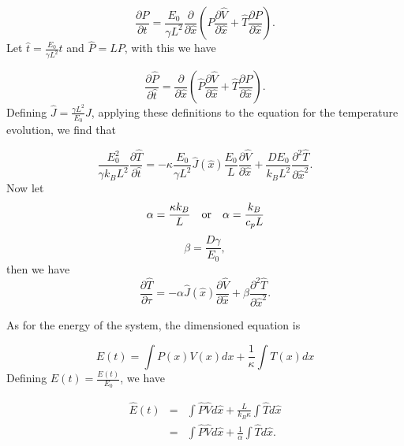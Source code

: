 \begin{equation}
\frac{\partial P}{\partial t} = \frac{E_0}{\gamma L^2} \frac{\partial}{\partial \hat{x}} \left (P \frac{\partial \hat{V}}{\partial \hat{x}} + \hat{T} \frac{\partial P}{\partial \hat{x}} \right ).
\end{equation}
Let $\hat{t} = \frac{E_0}{\gamma L^2} t$ and $\hat{P} = L P $, with this we have

\begin{equation}
\frac{\partial \hat{P}}{\partial \hat{t}} = \frac{\partial}{\partial \hat{x}} \left (\hat{P} \frac{\partial \hat{V}}{\partial \hat{x}} + \hat{T}  \frac{\partial \hat{P}}{\partial \hat{x}} \right ). \label{eqn:dimensionlessSmoluchowski}
\end{equation}
Defining $\hat{J} = \frac{\gamma L^2}{E_0} J $, applying these definitions to the equation for the temperature evolution, we find that

\begin{equation}
\frac{E_0^2}{\gamma k_B L^2} \frac{\partial \hat{T}}{\partial \hat{t}} = -\kappa \frac{E_0}{\gamma L^2}\hat{J}(\hat{x}) \frac{E_0}{L} \frac{\partial \hat{V}}{\partial \hat{x}} + \frac{D E_0}{k_B L^2} \frac{\partial^2 \hat{T}}{\partial \hat{x}^2}.
\end{equation}
Now let 
\begin{equation}
\alpha = \frac{\kappa k_B}{L} \quad \text{or} \quad \alpha = \frac{k_B}{c_p L} \\
\end{equation}
\begin{equation}
\beta = \frac{D \gamma}{E_0},
\end{equation}
then we have
\begin{equation}
\frac{\partial \hat{T}}{\partial \tau} = -\alpha \hat{J}(\hat{x}) \frac{\partial \hat{V}}{\partial \hat{x}} + \beta \frac{\partial^2 \hat{T}}{\partial \hat{x}^2}. \label{eqn:dimensionlessHeat}
\end{equation}

As for the energy of the system, the dimensioned equation is

\begin{equation}
E(t) = \int P(x) V(x) dx + \frac{1}{\kappa} \int T(x) dx
\end{equation}
Defining $\hat{E}(t) = \frac{E(t)}{E_0}$, we have

\begin{eqnarray}
\hat{E}(t) & = & \int \hat{P} \hat{V} d \hat{x} + \frac{L}{k_B \kappa} \int \hat{T} d\hat{x} \\
              & = & \int \hat{P} \hat{V} d \hat{x} + \frac{1}{\alpha} \int \hat{T} d\hat{x}.
\end{eqnarray}

